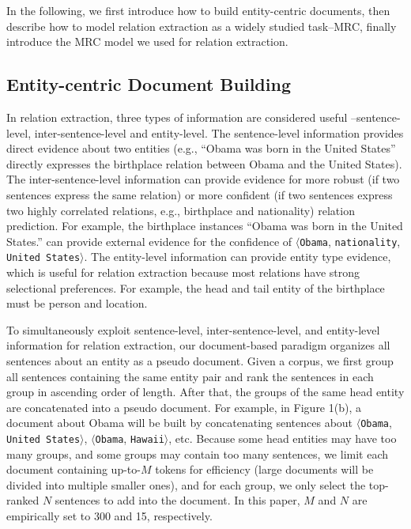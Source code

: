 \documentclass[11pt,a4paper]{article}
\begin{document}
  In the following, we first introduce how to build entity-centric documents, then describe how to model relation extraction as a widely studied task--MRC, finally introduce the MRC model we used for relation extraction.
  
  \subsection{Entity-centric Document Building}
  
  In relation extraction, three types of information are considered useful \cite{zheng_aggregating_2016,vashishth_reside_2018, yuan_crossrelation_2018, ye_distant_2019}--sentence-level, inter-sentence-level and entity-level.
  The sentence-level information provides direct evidence about two entities (e.g., ``Obama was born in the United States'' directly expresses the birthplace relation between Obama and the United States).
  The inter-sentence-level information can provide evidence for more robust (if two sentences express the same relation) or more confident (if two sentences express two highly correlated relations, e.g., birthplace and nationality) relation prediction.
  For example, the birthplace instances ``Obama was born in the United States.'' can provide external evidence for the confidence of $\langle$\texttt{Obama}, \texttt{nationality}, \texttt{United States}$\rangle$. 
  The entity-level information can provide entity type evidence, which is useful for relation extraction because most relations have strong selectional preferences.
  For example, the head and tail entity of the birthplace must be person and location.
  
  To simultaneously exploit sentence-level, inter-sentence-level, and entity-level information for relation extraction, our document-based paradigm organizes all sentences about an entity as a pseudo document.
  Given a corpus, we first group all sentences containing the same entity pair and rank the sentences in each group in ascending order of length.
  After that, the groups of the same head entity are concatenated into a pseudo document.
  For example, in Figure 1(b), a document about Obama will be built by concatenating sentences about $\langle$\texttt{Obama}, \texttt{United States}$\rangle$, $\langle$\texttt{Obama}, \texttt{Hawaii}$\rangle$, etc.
  Because some head entities may have too many groups, and some groups may contain too many sentences, we limit each document containing up-to-$M$ tokens for efficiency (large documents will be divided into multiple smaller ones), and for each group, we only select the top-ranked $N$ sentences to add into the document. In this paper, $M$ and $N$ are empirically set to 300 and 15, respectively.
  
\end{document}
